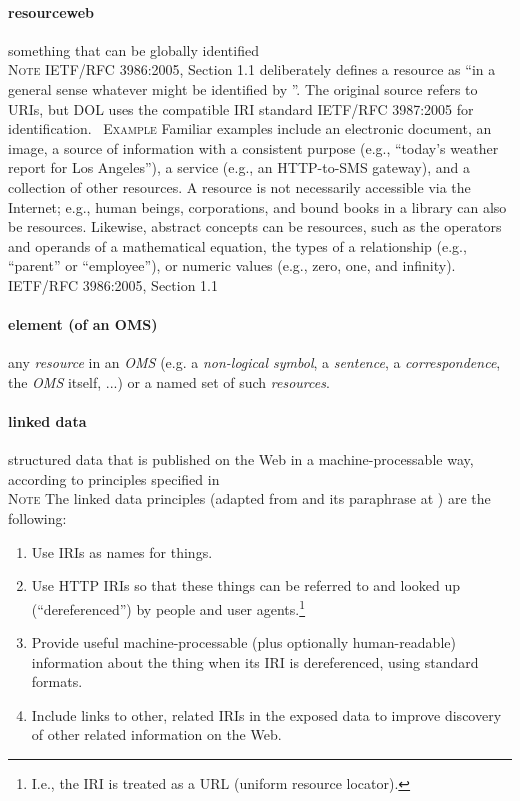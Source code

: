 \documentclass[10pt,%
\ifpretendfinal
final%
\else
draft%
\fi,
]{scrreprt}
\makeatletter
\newcommand*{\eg}{e.g.\@\xspace}
\newcommand*{\termref}[1]{\textit{#1}}
\newcommand*{\subjectfield}[1]{ {\textlangle}#1{\textrangle}}
\newcommand{\termdefinition}[2]{\paragraph{#1} #2}
\newcommand{\nisref}[1]{#1}
\renewcommand{\subjectfield}[1]{#1}
\newenvironment{definitions}[0]{\medskip }{}
\newenvironment{note}[0]{\ \\ \textsc{Note} \quad}{}
\newenvironment{example}[0]{\ \newline \textsc{Example}\quad }{}
\makeatother
\begin{document}
\begin{definitions}
  \termdefinition{resource\subjectfield{web}}{something that can be globally identified}
  \begin{note}
    \nisref{IETF/RFC 3986:2005, Section 1.1} deliberately defines a resource as ``in a general sense \textelp{} whatever might be identified by ''.  The original source refers to URIs, but DOL uses the compatible IRI standard \nisref{IETF/RFC 3987:2005} for identification.
  \end{note}
  \begin{example}
    Familiar examples include an electronic document, an image, a source of information with a consistent purpose (\eg, ``today's weather report for Los Angeles''), a service (\eg, an HTTP-to-SMS gateway), and a collection of other resources. A resource is not necessarily accessible via the Internet; \eg, human beings, corporations, and bound books in a library can also be resources. Likewise, abstract concepts can be resources, such as the operators and operands of a mathematical equation, the types of a relationship (\eg, ``parent'' or ``employee''), or numeric values (\eg, zero, one, and infinity). \nisref{IETF/RFC 3986:2005, Section 1.1}
  \end{example}
  \termdefinition{element (of an OMS)}{any \termref{resource} in an \termref{OMS} (\eg a \termref{non-logical symbol}, a \termref{sentence}, a \termref{correspondence}, the \termref{OMS} itself, ...) or a named set of such \termref{resources}.}
  
  \termdefinition{linked data}{structured data that is published on the Web in a machine-processable way, according to principles specified in \cite{BernersLee:LinkedData2006,BizerHeath09}}
  \begin{note}
    The linked data principles (adapted from \cite{BernersLee:LinkedData2006} and its paraphrase at \cite{Wikipedia:LinkedData2011}) are the following:
    \begin{enumerate}
    \item Use IRIs as names for things.
    \item Use HTTP IRIs so that these things can be referred to and looked up (``dereferenced'') by people and user agents.\footnote{I.e., the IRI is treated as a URL (uniform resource locator).}
    \item Provide useful machine-processable (plus optionally human-readable) information about the thing when its IRI is dereferenced, using standard formats.
    \item Include links to other, related IRIs in the exposed data to improve discovery of other related information on the Web.
    \end{enumerate}
  \end{note}


\end{definitions}
\end{document}
